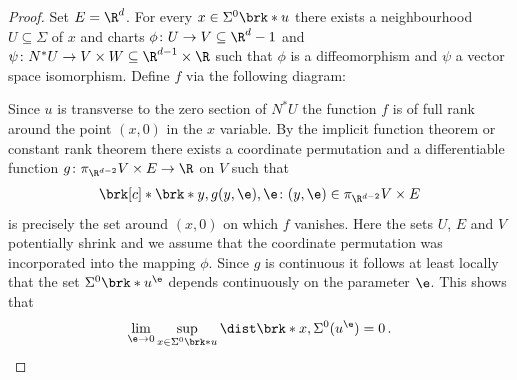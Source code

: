 \begin{proof}
  Set $E=\R^d$.
  For every $x\in \Sigma^0\brk*{u}$ there exists
  a neighbourhood $U\subseteq\Sigma$ of $x$ and charts
  $\phi\colon U\to V\subseteq\R^d-1$ and $\psi\colon N^*U\to V\times W\subseteq\R^{d-1}\times\R$
  such that $\phi$ is a diffeomorphism and $\psi$ a vector space isomorphism.
  Define $f$ via the following diagram:
  \begin{center}
    \tikzset{external/export next=false}
  \end{center}
  Since $u$ is transverse to the zero section of $N^*U$ the function $f$ is of full rank around the
  point $(x,0)$ in the $x$ variable.
  By the implicit function theorem or constant rank theorem there exists  a coordinate permutation
  and a differentiable function $g\colon \pi_{\R^{d-2}}V\times E\to \R$ on $V$ such that
  \begin{align}
    \brk[c]*{\brk*{y,g(y,\e),\e}\colon (y,\e)\in \pi_{\R^{d-2}}V\times E}
  \end{align}
  is precisely the set around $(x,0)$ on which $f$ vanishes.
  Here the sets $U$, $E$ and $V$ potentially shrink and we assume that the coordinate permutation was incorporated into the
  mapping $\phi$. Since $g$ is continuous it follows at least locally that the
  set $\Sigma^0\brk*{u^\e}$ depends continuously on the parameter $\e$.
  This shows that
  \begin{align}
    \lim_{\e\to0}\sup_{x\in\Sigma^0\brk*{u}}\dist\brk*{x,\Sigma^0(u^\e)}=0\,.
    \label{eq:convergence_Sigma0_limsup1}
  \end{align}


\end{proof}
